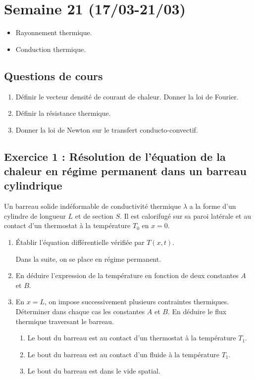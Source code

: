 \section{Semaine 21 (17/03-21/03)}


\begin{itemize}
	\item Rayonnement thermique.
	\item Conduction thermique.
\end{itemize}

\subsection{Questions de cours}
\begin{enumerate}
	\item Définir le vecteur densité de courant de chaleur. Donner la loi de Fourier.
	\item Définir la résistance thermique. 
	\item Donner la loi de Newton sur le transfert conducto-convectif.
\end{enumerate}


\subsection{Exercice 1 : Résolution de l'équation de la chaleur en régime permanent dans un barreau cylindrique}

Un barreau solide indéformable de conductivité thermique $\lambda$ a la forme d'un cylindre de longueur $L$ et de section $S$. Il est calorifugé sur sa paroi latérale et au contact d'un thermostat à la température $T_0$ en $x = 0$.

\begin{enumerate}
	\item Établir l'équation différentielle vérifiée par $T(x, t)$. 
	
	Dans la suite, on se place en régime permanent.
	
	\item En déduire l'expression de la température en fonction de deux constantes $A$ et $B$.

	\item En $x = L$, on impose successivement plusieurs contraintes thermiques. Déterminer dans chaque cas les constantes $A$ et $B$. En déduire le flux thermique traversant le barreau.
	\begin{enumerate}
		\item Le bout du barreau est au contact d'un thermostat à la température $T_1$.
		\item Le bout du barreau est au contact d'un fluide à la température $T_1$.
		\item Le bout du barreau est dans le vide spatial.
	\end{enumerate}
\end{enumerate}

